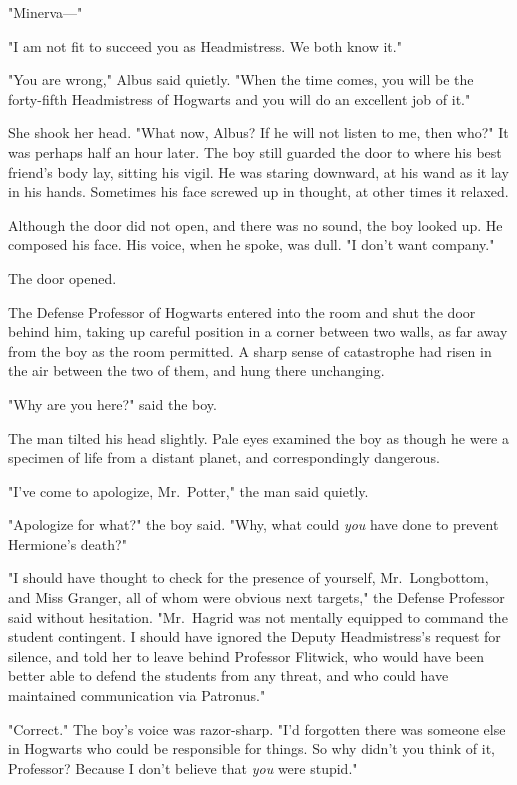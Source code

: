 "Minerva---"

"I am not fit to succeed you as Headmistress. We both know it."

"You are wrong," Albus said quietly. "When the time comes, you will be the 
forty-fifth Headmistress of Hogwarts and you will do an excellent job of it."

She shook her head. "What now, Albus? If he will not listen to me, then who?"
\sbreak
It was perhaps half an hour later. The boy still guarded the door to where his 
best friend's body lay, sitting his vigil. He was staring downward, at his wand 
as it lay in his hands. Sometimes his face screwed up in thought, at other 
times it relaxed.

Although the door did not open, and there was no sound, the boy looked up. He 
composed his face. His voice, when he spoke, was dull. "I don't want company."

The door opened.

The Defense Professor of Hogwarts entered into the room and shut the door 
behind him, taking up careful position in a corner between two walls, as far 
away from the boy as the room permitted. A sharp sense of catastrophe had risen 
in the air between the two of them, and hung there unchanging.

"Why are you here?" said the boy.

The man tilted his head slightly. Pale eyes examined the boy as though he were 
a specimen of life from a distant planet, and correspondingly dangerous.

"I've come to apologize, Mr.~Potter," the man said quietly.

"Apologize for what?" the boy said. "Why, what could \emph{you} have done to 
prevent Hermione's death?"

"I should have thought to check for the presence of yourself, Mr.~Longbottom, 
and Miss Granger, all of whom were obvious next targets," the Defense Professor 
said without hesitation. "Mr.~Hagrid was not mentally equipped to command the 
student contingent. I should have ignored the Deputy Headmistress's request for 
silence, and told her to leave behind Professor Flitwick, who would have been 
better able to defend the students from any threat, and who could have 
maintained communication via Patronus."

"Correct." The boy's voice was razor-sharp. "I'd forgotten there was someone 
else in Hogwarts who could be responsible for things. So why didn't you think 
of it, Professor? Because I don't believe that \emph{you} were stupid."

